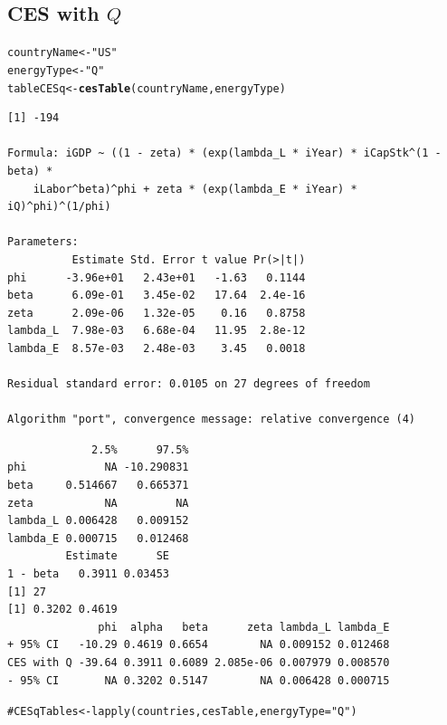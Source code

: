 \documentclass[preprint,authoryear,12pt]{elsarticle}\usepackage{graphicx, color}
\makeatletter
\newcommand{\hlfunctioncall}[1]{\textcolor[rgb]{0.501960784313725,0,0.329411764705882}{\textbf{#1}}}%
\newcommand{\hlstring}[1]{\textcolor[rgb]{0.6,0.6,1}{#1}}%
\newcommand{\hlcomment}[1]{\textcolor[rgb]{0.180392156862745,0.6,0.341176470588235}{#1}}%
\newenvironment{kframe}{%
 \def\at@end@of@kframe{}%
 \ifinner\ifhmode%
  \def\at@end@of@kframe{\end{minipage}}%
  \begin{minipage}{\columnwidth}%
 \fi\fi%
 \def\FrameCommand##1{\hskip\@totalleftmargin \hskip-\fboxsep
 \colorbox{shadecolor}{##1}\hskip-\fboxsep
     \hskip-\linewidth \hskip-\@totalleftmargin \hskip\columnwidth}%
 \MakeFramed {\advance\hsize-\width
   \@totalleftmargin\z@ \linewidth\hsize
   \@setminipage}}%
 {\par\unskip\endMakeFramed%
 \at@end@of@kframe}
\newenvironment{knitrout}{}{} %
\makeatother
\begin{document}
\subsection{CES with $Q$}
\begin{knitrout}
\color{fgcolor}\begin{kframe}
\begin{alltt}
countryName <- \hlstring{"US"}
energyType <- \hlstring{"Q"}
tableCESq <- \hlfunctioncall{cesTable}(countryName, energyType)
\end{alltt}
\begin{verbatim}
[1] -194

Formula: iGDP ~ ((1 - zeta) * (exp(lambda_L * iYear) * iCapStk^(1 - beta) * 
    iLabor^beta)^phi + zeta * (exp(lambda_E * iYear) * iQ)^phi)^(1/phi)

Parameters:
          Estimate Std. Error t value Pr(>|t|)
phi      -3.96e+01   2.43e+01   -1.63   0.1144
beta      6.09e-01   3.45e-02   17.64  2.4e-16
zeta      2.09e-06   1.32e-05    0.16   0.8758
lambda_L  7.98e-03   6.68e-04   11.95  2.8e-12
lambda_E  8.57e-03   2.48e-03    3.45   0.0018

Residual standard error: 0.0105 on 27 degrees of freedom

Algorithm "port", convergence message: relative convergence (4) 
\end{verbatim}


{\ttfamily\noindent\itshape\color{messagecolor}{Waiting for profiling to be done...}}\begin{verbatim}
             2.5%      97.5%
phi            NA -10.290831
beta     0.514667   0.665371
zeta           NA         NA
lambda_L 0.006428   0.009152
lambda_E 0.000715   0.012468
         Estimate      SE
1 - beta   0.3911 0.03453
[1] 27
[1] 0.3202 0.4619
              phi  alpha   beta      zeta lambda_L lambda_E
+ 95% CI   -10.29 0.4619 0.6654        NA 0.009152 0.012468
CES with Q -39.64 0.3911 0.6089 2.085e-06 0.007979 0.008570
- 95% CI       NA 0.3202 0.5147        NA 0.006428 0.000715
\end{verbatim}
\begin{alltt}

\hlcomment{#CESqTables <- lapply(countries, cesTable, energyType="Q")}
\end{alltt}
\end{kframe}
\end{knitrout}
\end{document}
